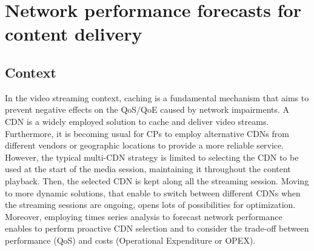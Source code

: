 \chapter{Network performance forecasts for content delivery}
\label{chap:predictive}

\section{Context}

In the video streaming context, caching is a fundamental mechanism that aims to prevent negative effects on the QoS/QoE caused by network impairments. A CDN is a widely employed solution to cache and deliver video streams. Furthermore, it is becoming usual for CPs to employ alternative CDNs from different vendors or geographic locations to provide a more reliable service. However, the typical multi-CDN strategy is limited to selecting the CDN to be used at the start of the media session, maintaining it throughout the content playback. Then, the selected CDN is kept along all the streaming session. Moving to more dynamic solutions, that enable to switch between different CDNs when the streaming sessions are ongoing, opens lots of possibilities for optimization. Moreover, employing times series analysis to forecast network performance enables to perform proactive CDN selection and to consider the trade-off between performance (QoS) and costs (Operational Expenditure or OPEX).

